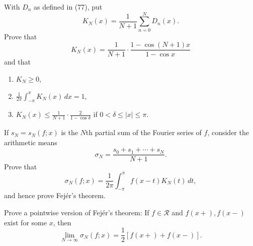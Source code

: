  \begin{exercise}[Rudin 8.15]
    With $D_n$ as defined in (77), put
    \begin{equation}
      K_N(x) = \frac{1}{N+1} \sum_{n=0}^N D_n(x).
    \end{equation}
    Prove that
    \begin{equation}
      K_N(x) = \frac{1}{N+1} \cdot \frac{1 - \cos (N+1)x}{1 - \cos x}
    \end{equation}
    and that
    \begin{enumerate}
      \item $K_N \geq 0$,
      \item $\frac{1}{2\pi} \int_{-\pi}^\pi K_N(x) \, dx = 1$,
      \item $K_N(x) \leq \frac{1}{N+1} \cdot \frac{2}{1 - \cos \delta}$ if $0 < \delta \leq |x| \leq \pi$.
    \end{enumerate}
    If $s_N = s_N(f; x)$ is the $N$th partial sum of the Fourier series of $f$, consider the arithmetic means
    \begin{equation}
      \sigma_N = \frac{s_0 + s_1 + \cdots + s_N}{N+1}.
    \end{equation}
    Prove that
    \begin{equation}
      \sigma_N(f; x) = \frac{1}{2\pi} \int_{-\pi}^\pi f(x-t) K_N(t) \, dt,
    \end{equation}
    and hence prove Fejér's theorem.
  \end{exercise}
  \begin{solution}

  \end{solution}

  \begin{exercise}[Rudin 8.16]
    Prove a pointwise version of Fejér's theorem: If $f \in \mathscr{R}$ and $f(x+), f(x-)$ exist for some $x$, then
    \begin{equation}
      \lim_{N \to \infty} \sigma_N(f; x) = \frac{1}{2} [f(x+) + f(x-)].
    \end{equation}
  \end{exercise}
  \begin{solution}

  \end{solution}

